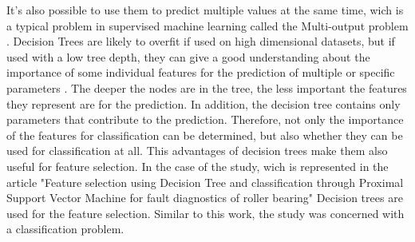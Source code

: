 \documentclass[../masterarbeit.tex]{subfiles}
\begin{document}
It's also possible to use them to predict multiple values at the same time, wich is a typical problem in supervised machine learning called the Multi-output problem \textcite[]{Scikit-learn-decision-tree:2022}.
Decision Trees are likely to overfit if used on high dimensional datasets, but if used with a low tree depth, they can give a good understanding about the importance of some individual features for the prediction of multiple or specific parameters \textcite[]{Scikit-learn-decision-tree:2022}. The deeper the nodes are in the tree, the less important the features they represent are for the prediction. In addition, the decision tree contains only parameters that contribute to the prediction.
Therefore, not only the importance of the features for classification can be determined, but also whether they can be used for classification at all. \autocite[]{SUGUMARAN2007930}
This advantages of decision trees make them also useful for feature selection. 
In the case of the study, wich is represented in the article "Feature selection using Decision Tree and classification through Proximal Support Vector Machine for fault diagnostics of roller bearing" \textcite[]{SUGUMARAN2007930} Decision trees are used for the feature selection. Similar to this work, the study was concerned with a classification problem.
\end{document}
